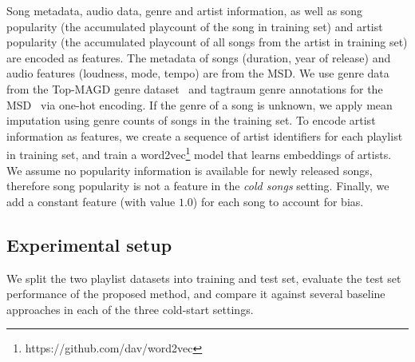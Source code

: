 Song metadata, audio data, genre and artist information, as well as song popularity
(\ie the accumulated playcount of the song in training set)
and artist popularity 
(\ie the accumulated playcount of all songs from the artist in training set)
are encoded as features.
%
The metadata of songs (\eg duration, year of release) and audio features (\eg loudness, mode, tempo) are from the MSD.
We use genre data from the Top-MAGD genre dataset~\cite{schindler2012facilitating}
and tagtraum genre annotations for the MSD~\cite{schreiber2015improving} via one-hot encoding.
If the genre of a song is unknown, 
we apply mean imputation using genre counts of songs in the training set.
To encode artist information as features,
we create a sequence of artist identifiers for each playlist in training set, and train
a word2vec\footnote{https://github.com/dav/word2vec} model that learns embeddings of artists.
%
We assume no popularity information is available for newly released songs,
therefore song popularity is not a feature in the \emph{cold songs} setting.
Finally, we add a constant feature (with value $1.0$) for each song to account for bias.




\subsection{Experimental setup}

We split the two playlist datasets into training and test set, %
evaluate the test set performance of the proposed method,
and compare it against
several baseline approaches
in each of the three cold-start settings.


